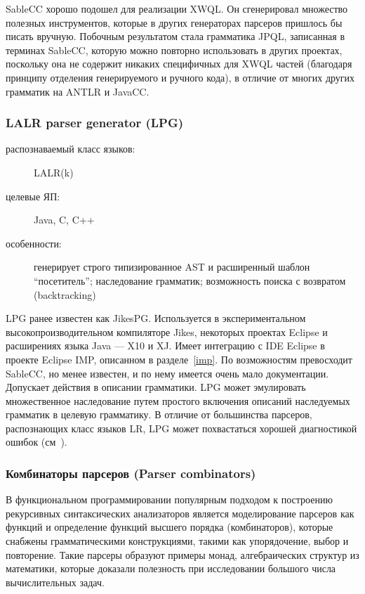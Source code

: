 \documentclass[a4paper,12pt,titlepage]{extarticle}
\begin{document}
SableCC хорошо подошел для реализации XWQL. Он сгенерировал множество полезных инструментов,
которые в других генераторах парсеров пришлось бы писать вручную. Побочным
результатом стала грамматика JPQL, записанная в терминах SableCC, которую можно
повторно использовать в других проектах, поскольку она не содержит никаких
специфичных для XWQL частей (благодаря принципу отделения генерируемого и
ручного кода), в отличие от многих других грамматик на ANTLR и JavaCC.

\subsubsection*{LALR parser generator (LPG)}
\begin{description}
  \item[распознаваемый класс языков:] LALR(k)
  \item[целевые ЯП:] Java, C, C++
  \item[особенности:] генерирует строго типизированное AST и расширенный
 	шаблон ``посетитель''; наследование грамматик; возможность поиска с возвратом
 	(backtracking)
\end{description}

LPG ранее известен как JikesPG. Используется в экспериментальном
высокопроизводительном компиляторе Jikes, некоторых проектах
Eclipse и расширениях языка Java --- X10 и XJ. Имеет интеграцию с IDE Eclipse в
проекте Eclipse IMP, описанном в разделе~\ref{imp}. По возможностям превосходит
SableCC, но менее известен, и по нему имеется очень мало документации.
Допускает действия в описании грамматики. LPG может эмулировать множественное
наследование путем простого включения описаний наследуемых грамматик в целевую
грамматику. В отличие от большинства парсеров, распознающих класс языков LR,
LPG может похвастаться хорошей диагностикой ошибок (см~\cite{lpgerr}).

\subsubsection*{Комбинаторы парсеров (Parser combinators)}
В функциональном программировании популярным подходом к построению рекурсивных
синтаксических анализаторов является моделирование парсеров как функций и
определение функций высшего порядка (комбинаторов), которые снабжены
грамматическими конструкциями, такими как упорядочение, выбор и повторение.
Такие парсеры образуют примеры монад, алгебраических структур из математики,
которые доказали полезность при исследовании большого числа вычислительных
задач. 
\end{document}
